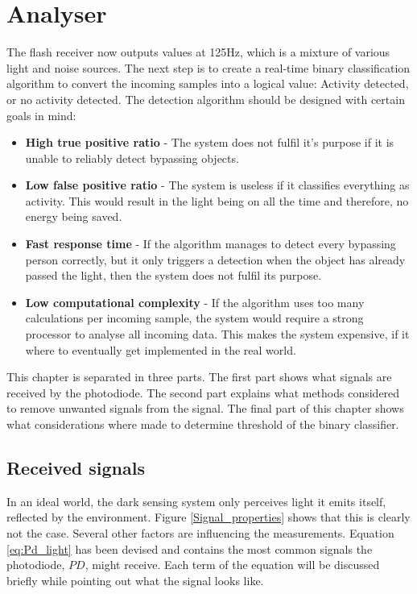 \chapter{Analyser}
\label{chp:Analyser}
The flash receiver now outputs values at 125Hz, which is a mixture of various light and noise sources. The next step is to create a real-time binary classification algorithm to convert the incoming samples into a logical value: Activity detected, or no activity detected. The detection algorithm should be designed with certain goals in mind:
\begin{itemize}[itemsep=-1ex]
	\item \textbf{High true positive ratio} - The system does not fulfil it's purpose if it is unable to reliably detect bypassing objects.
	\item \textbf{Low false positive ratio} - The system is useless if it classifies everything as activity. This would result in the light being on all the time and therefore, no energy being saved.
	\item \textbf{Fast response time} - If the algorithm manages to detect every bypassing person correctly, but it only triggers a detection when the object has already passed the light, then the system does not fulfil its purpose.
	\item \textbf{Low computational complexity} - If the algorithm uses too many calculations per incoming sample, the system would require a strong processor to analyse all incoming data. This makes the system expensive, if it where to eventually get implemented in the real world.
\end{itemize}
This chapter is separated in three parts. The first part shows what signals are received by the photodiode. The second part explains what methods considered to remove unwanted signals from the signal. The final part of this chapter shows what considerations where made to determine threshold of the binary classifier.

\section{Received signals}
In an ideal world, the dark sensing system only perceives light it emits itself, reflected by the environment. Figure \ref{Signal_properties} shows that this is clearly not the case. Several other factors are influencing the measurements. Equation \ref{eq:Pd_light} has been devised and contains the most common signals the photodiode, $PD$, might receive. Each term of the equation will be discussed briefly while pointing out what the signal looks like.


